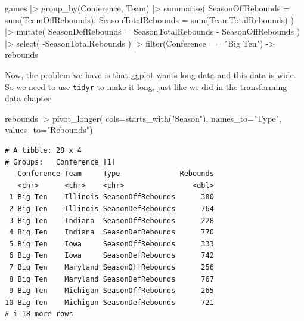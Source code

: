 \documentclass[
  letterpaper,
  DIV=11,
  numbers=noendperiod]{scrreprt}
\newenvironment{Shaded}{\begin{snugshade}}{\end{snugshade}}
\newcommand{\AttributeTok}[1]{\textcolor[rgb]{0.40,0.45,0.13}{#1}}
\newcommand{\FunctionTok}[1]{\textcolor[rgb]{0.28,0.35,0.67}{#1}}
\newcommand{\NormalTok}[1]{\textcolor[rgb]{0.00,0.23,0.31}{#1}}
\newcommand{\OtherTok}[1]{\textcolor[rgb]{0.00,0.23,0.31}{#1}}
\newcommand{\SpecialCharTok}[1]{\textcolor[rgb]{0.37,0.37,0.37}{#1}}
\newcommand{\StringTok}[1]{\textcolor[rgb]{0.13,0.47,0.30}{#1}}
\begin{document}
\begin{Shaded}
\begin{Highlighting}[]
\NormalTok{games }\SpecialCharTok{|\textgreater{}} 
  \FunctionTok{group\_by}\NormalTok{(Conference, Team) }\SpecialCharTok{|\textgreater{}} 
  \FunctionTok{summarise}\NormalTok{(}
    \AttributeTok{SeasonOffRebounds =} \FunctionTok{sum}\NormalTok{(TeamOffRebounds),}
    \AttributeTok{SeasonTotalRebounds =} \FunctionTok{sum}\NormalTok{(TeamTotalRebounds)}
\NormalTok{  ) }\SpecialCharTok{|\textgreater{}}
  \FunctionTok{mutate}\NormalTok{(}
    \AttributeTok{SeasonDefRebounds =}\NormalTok{ SeasonTotalRebounds }\SpecialCharTok{{-}}\NormalTok{ SeasonOffRebounds}
\NormalTok{  ) }\SpecialCharTok{|\textgreater{}} 
  \FunctionTok{select}\NormalTok{(}
    \SpecialCharTok{{-}}\NormalTok{SeasonTotalRebounds}
\NormalTok{  ) }\SpecialCharTok{|\textgreater{}} 
  \FunctionTok{filter}\NormalTok{(Conference }\SpecialCharTok{==} \StringTok{"Big Ten"}\NormalTok{) }\OtherTok{{-}\textgreater{}}\NormalTok{ rebounds}
\end{Highlighting}
\end{Shaded}

Now, the problem we have is that ggplot wants long data and this data is
wide. So we need to use \texttt{tidyr} to make it long, just like we did
in the transforming data chapter.

\begin{Shaded}
\begin{Highlighting}[]
\NormalTok{rebounds }\SpecialCharTok{|\textgreater{}} 
  \FunctionTok{pivot\_longer}\NormalTok{(}
    \AttributeTok{cols=}\FunctionTok{starts\_with}\NormalTok{(}\StringTok{"Season"}\NormalTok{), }
    \AttributeTok{names\_to=}\StringTok{"Type"}\NormalTok{, }
    \AttributeTok{values\_to=}\StringTok{"Rebounds"}\NormalTok{)}
\end{Highlighting}
\end{Shaded}

\begin{verbatim}
# A tibble: 28 x 4
# Groups:   Conference [1]
   Conference Team     Type              Rebounds
   <chr>      <chr>    <chr>                <dbl>
 1 Big Ten    Illinois SeasonOffRebounds      300
 2 Big Ten    Illinois SeasonDefRebounds      764
 3 Big Ten    Indiana  SeasonOffRebounds      228
 4 Big Ten    Indiana  SeasonDefRebounds      770
 5 Big Ten    Iowa     SeasonOffRebounds      333
 6 Big Ten    Iowa     SeasonDefRebounds      742
 7 Big Ten    Maryland SeasonOffRebounds      256
 8 Big Ten    Maryland SeasonDefRebounds      767
 9 Big Ten    Michigan SeasonOffRebounds      265
10 Big Ten    Michigan SeasonDefRebounds      721
# i 18 more rows
\end{verbatim}
\end{document}
